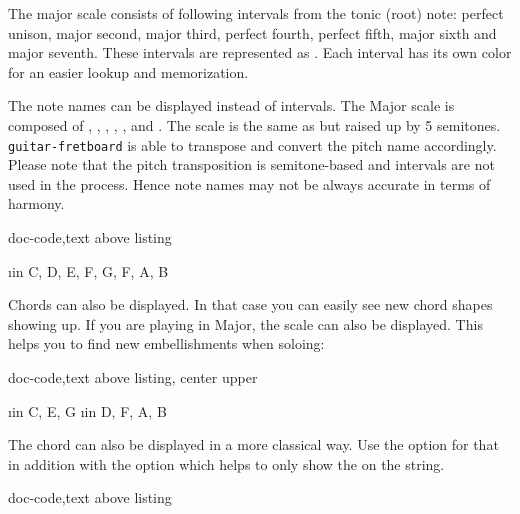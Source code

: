 \documentclass[a4paper]{article}
\newcommand{\pkg}[1]{\texttt{#1}}
\begin{document}
The major scale consists of following intervals from the tonic (root) note:
perfect unison, major second, major third, perfect fourth, perfect fifth,
major sixth and major seventh. These intervals are represented as
. Each interval has its own color for an
easier lookup and memorization.

The note names can be displayed instead of intervals. The \pF Major scale is
composed of \pF, \pG, \pA, \pBb, \pC, \pD and \pE. The \pF scale is the same
as \pC but raised up by 5 semitones. \pkg{guitar-fretboard} is able to
transpose and convert the pitch name accordingly. Please note that the pitch
transposition is semitone-based and intervals are not used in the
process. Hence note names may not be always accurate in terms of harmony.

\begin{tcblisting}{doc-code,text above listing}
  \begin{fretboard}[frets before = 2, frets after = 2,
      transpose = 5,
      transpose pitch,
      title = {\pF Major scale\\\Large (\pF, \pG, \pA, \pBb, \pC, \pD, \pE)},
      scale=0.35,
      fret numbers]
    \foreach \i in { C, D, E, F, G, F, A, B} {
      \FBnote[split]{\i}
    }
  \end{fretboard}
\end{tcblisting}



Chords can also be displayed. In that case you can easily see new \pC chord
shapes showing up. If you are playing in \pC Major, the scale can also be
displayed. This helps you to find new embellishments when soloing:

\begin{tcblisting}{doc-code,text above listing, center upper}
  \begin{fretboard}[frets before = 2, frets after = 2,
      title = {\pC Chord (and \pC major scale)},
      scale = 0.35,
      fret numbers]
    \foreach \i in {C, E, G} {
      \FBnote{\i}
    }
    \foreach \i in {D, F, A, B} {
      \FBnote[shade]{\i}
    }
  \end{fretboard}
\end{tcblisting}

The \pC chord can also be displayed in a more classical way. Use the
 option for that in addition with the  option which
helps to only show the \pG on the  string.

\begin{tcblisting}{doc-code,text above listing}
  \begin{fretboard}[frets min = 0, frets max = 3, fret numbers,
      title = {\pC}, chord, scale=0.35]
      
  \end{fretboard}
\end{tcblisting}
\end{document}
